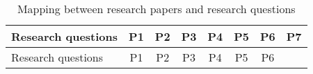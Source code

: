 \begin{longtable}[c]{@{}lccccccc@{}}
\caption{Mapping between research papers and research
questions}\tabularnewline
\toprule
\begin{minipage}[b]{0.37\columnwidth}\raggedright\strut
Research questions
\strut\end{minipage} &
\begin{minipage}[b]{0.05\columnwidth}\centering\strut
P1
\strut\end{minipage} &
\begin{minipage}[b]{0.05\columnwidth}\centering\strut
P2
\strut\end{minipage} &
\begin{minipage}[b]{0.05\columnwidth}\centering\strut
P3
\strut\end{minipage} &
\begin{minipage}[b]{0.05\columnwidth}\centering\strut
P4
\strut\end{minipage} &
\begin{minipage}[b]{0.05\columnwidth}\centering\strut
P5
\strut\end{minipage} &
\begin{minipage}[b]{0.05\columnwidth}\centering\strut
P6
\strut\end{minipage} &
\begin{minipage}[b]{0.05\columnwidth}\centering\strut
P7
\strut\end{minipage}\tabularnewline
\midrule
\endfirsthead
\toprule
\begin{minipage}[b]{0.37\columnwidth}\raggedright\strut
Research questions
\strut\end{minipage} &
\begin{minipage}[b]{0.05\columnwidth}\centering\strut
P1
\strut\end{minipage} &
\begin{minipage}[b]{0.05\columnwidth}\centering\strut
P2
\strut\end{minipage} &
\begin{minipage}[b]{0.05\columnwidth}\centering\strut
P3
\strut\end{minipage} &
\begin{minipage}[b]{0.05\columnwidth}\centering\strut
P4
\strut\end{minipage} &
\begin{minipage}[b]{0.05\columnwidth}\centering\strut
P5
\strut\end{minipage} &
\begin{minipage}[b]{0.05\columnwidth}\centering\strut
P6
\strut\end{minipage} &

\end{longtable}
